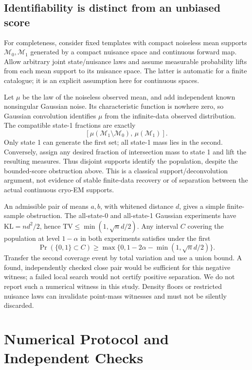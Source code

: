 \subsection{Identifiability is distinct from an unbiased score}
For completeness, consider fixed templates with compact noiseless mean
supports $\mathcal M_0,\mathcal M_1$ generated by a compact nuisance space
and continuous forward map. Allow arbitrary joint state/nuisance laws and
assume measurable probability lifts from each mean support to its nuisance
space. The latter is automatic for a finite catalogue; it is an explicit
assumption here for continuous spaces.

Let $\mu$ be the law of the noiseless observed mean, and add independent
known nonsingular Gaussian noise. Its characteristic function is nowhere
zero, so Gaussian convolution identifies $\mu$ from the infinite-data
observed distribution. The compatible state-1 fractions are exactly
\begin{equation}
\left[\mu(\mathcal M_1\setminus\mathcal M_0),\,
\mu(\mathcal M_1)\right].
\end{equation}
Only state 1 can generate the first set; all state-1 mass lies in the
second. Conversely, assign any desired fraction of intersection mass to
state 1 and lift the resulting measures. Thus disjoint supports identify
the population, despite the bounded-score obstruction above. This is a
classical support/deconvolution argument, not evidence of stable finite-data
recovery or of separation between the actual continuous cryo-EM supports.

An admissible pair of means $a,b$, with whitened distance $d$, gives a
simple finite-sample obstruction. The all-state-0 and all-state-1 Gaussian
experiments have $\mathrm{KL}=nd^2/2$, hence
$\mathrm{TV}\le\min(1,\sqrt n d/2)$. Any interval $C$ covering the
population at level $1-\alpha$ in both experiments satisfies under the
first
\begin{equation}
\Pr(\{0,1\}\subset C)\ge
\max\{0,1-2\alpha-\min(1,\sqrt n d/2)\}.
\end{equation}
Transfer the second coverage event by total variation and use a union
bound. A found, independently checked close pair would be sufficient for
this negative witness; a failed local search would not certify positive
separation. We do not report such a numerical witness in this study.
Density floors or restricted nuisance laws can invalidate point-mass
witnesses and must not be silently discarded.

\section{Numerical Protocol and Independent Checks}\label{app:numerics-new}
